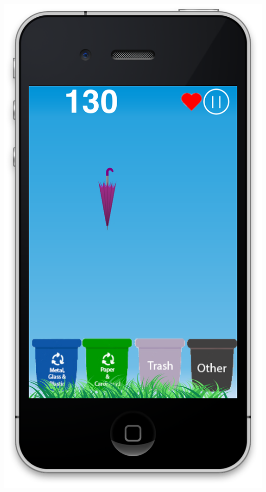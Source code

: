 \documentclass[11pt]{article}
\begin{document}
\includegraphics[scale=0.3]{gameplay2}
\end{document}
